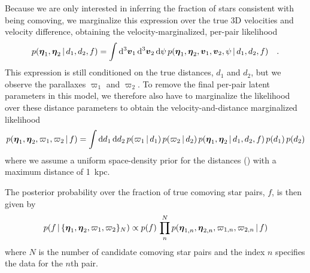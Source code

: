 \documentclass[modern, letterpaper]{aastex61}
\begin{document}
Because we are only interested in inferring the fraction of stars consistent
with being comoving, we marginalize this expression over the true 3D velocities
and velocity difference, obtaining the velocity-marginalized, per-pair
likelihood
\begin{equation}
    p(\bs{\eta}_1, \bs{\eta}_2 \given d_1, d_2, f) =
    \int \dd^3\bs{v}_1 \, \dd^3\bs{v}_2 \, \dd \psi \,
    p(\bs{\eta}_1, \bs{\eta}_2, \bs{v}_1, \bs{v}_2, \psi \given d_1, d_2, f)
    \quad .
\end{equation}
This expression is still conditioned on the true distances, $d_1$ and $d_2$, but
we observe the parallaxes $\varpi_1$ and $\varpi_2$.
To remove the final per-pair latent parameters in this model, we therefore also
have to marginalize the likelihood over these distance parameters to obtain the
velocity-and-distance marginalized likelihood
\begin{equation}
    p(\bs{\eta}_1, \bs{\eta}_2, \varpi_1, \varpi_2 \given f) =
        \int \dd d_1 \, \dd d_2 \,
        p(\varpi_1 \given d_1) \, p(\varpi_2 \given d_2) \,
        p(\bs{\eta}_1, \bs{\eta}_2 \given d_1, d_2, f) \,
        p(d_1) \, p(d_2)
\end{equation}
where we assume a uniform space-density prior for the distances
(\citealt{Bailer-Jones:2015aa}) with a maximum distance of 1~kpc.

The posterior probability over the fraction of true comoving star pairs, $f$, is
then given by
\begin{equation}
    p(f \given \{\bs{\eta}_1, \bs{\eta}_2, \varpi_1, \varpi_2\}_{N}) \propto
        p(f) \, \prod_n^N
        p(\bs{\eta}_{1,n}, \bs{\eta}_{2,n}, \varpi_{1,n}, \varpi_{2,n} \given f)
\end{equation}
where $N$ is the number of candidate comoving star pairs and the index $n$
specifies the data for the $n$th pair.
\end{document}
